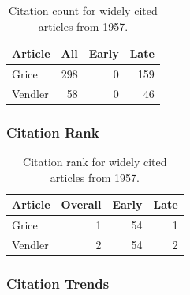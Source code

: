 \documentclass[
  10pt,
  letterpaper,
  DIV=11,
  numbers=noendperiod,
  twoside]{scrartcl}
\begin{document}
\begin{longtable}[]{@{}lrrr@{}}

\caption{\label{tbl-citation-count-1957}Citation count for widely cited
articles from 1957.}

\tabularnewline

\toprule\noalign{}
Article & All & Early & Late \\
\midrule\noalign{}
\endhead
\bottomrule\noalign{}
\endlastfoot
Grice & 298 & 0 & 159 \\
Vendler & 58 & 0 & 46 \\

\end{longtable}

\subsubsection*{Citation Rank}\label{sec-rank-1957}

\begin{longtable}[]{@{}lrrr@{}}

\caption{\label{tbl-citation-rank-1957}Citation rank for widely cited
articles from 1957.}

\tabularnewline

\toprule\noalign{}
Article & Overall & Early & Late \\
\midrule\noalign{}
\endhead
\bottomrule\noalign{}
\endlastfoot
Grice & 1 & 54 & 1 \\
Vendler & 2 & 54 & 2 \\

\end{longtable}

\subsubsection*{Citation Trends}\label{sec-trends-1957}
\end{document}
